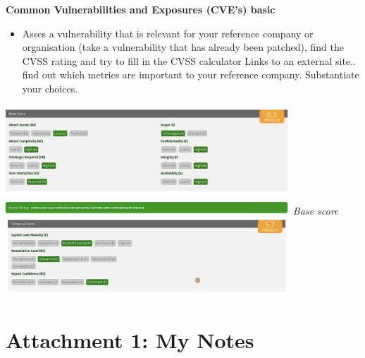 \documentclass[12pt, letterpaper]{article}
\begin{document}
\newpage
\textbf{Common Vulnerabilities and Exposures (CVE's) basic}
\begin{itemize}
    \item Asses a vulnerability that is relevant for your reference company or organisation (take a vulnerability that has already been patched), find the CVSS rating and try to fill in the CVSS calculator Links to an external site.. find out which metrics are important to your reference company. Substantiate your choices.
\end{itemize}
\hfill\break
\includegraphics[width=0.8\textwidth]{fotos/Week 1011/CVE/Basescore.jpeg}
\break
\emph{Base score}
\hfill\break
\hfill\break
\includegraphics[width=0.8\textwidth]{fotos/Week 1011/CVE/Temp score.jpeg}
\newpage

\section{Attachment 1: My Notes}
\end{document}
